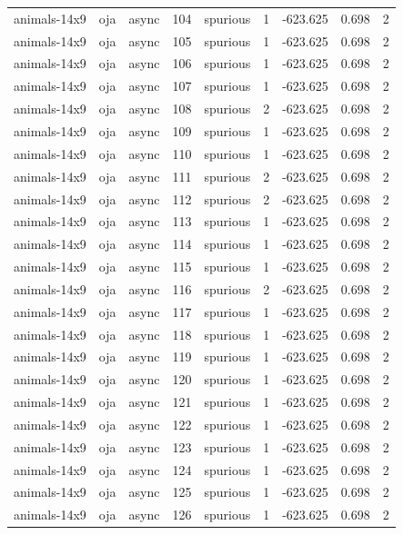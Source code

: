 \begin{tabular}{lllrlrrrr}
animals-14x9 & oja & async & 104 & spurious & 1 & -623.625 & 0.698 & 2 \\
animals-14x9 & oja & async & 105 & spurious & 1 & -623.625 & 0.698 & 2 \\
animals-14x9 & oja & async & 106 & spurious & 1 & -623.625 & 0.698 & 2 \\
animals-14x9 & oja & async & 107 & spurious & 1 & -623.625 & 0.698 & 2 \\
animals-14x9 & oja & async & 108 & spurious & 2 & -623.625 & 0.698 & 2 \\
animals-14x9 & oja & async & 109 & spurious & 1 & -623.625 & 0.698 & 2 \\
animals-14x9 & oja & async & 110 & spurious & 1 & -623.625 & 0.698 & 2 \\
animals-14x9 & oja & async & 111 & spurious & 2 & -623.625 & 0.698 & 2 \\
animals-14x9 & oja & async & 112 & spurious & 2 & -623.625 & 0.698 & 2 \\
animals-14x9 & oja & async & 113 & spurious & 1 & -623.625 & 0.698 & 2 \\
animals-14x9 & oja & async & 114 & spurious & 1 & -623.625 & 0.698 & 2 \\
animals-14x9 & oja & async & 115 & spurious & 1 & -623.625 & 0.698 & 2 \\
animals-14x9 & oja & async & 116 & spurious & 2 & -623.625 & 0.698 & 2 \\
animals-14x9 & oja & async & 117 & spurious & 1 & -623.625 & 0.698 & 2 \\
animals-14x9 & oja & async & 118 & spurious & 1 & -623.625 & 0.698 & 2 \\
animals-14x9 & oja & async & 119 & spurious & 1 & -623.625 & 0.698 & 2 \\
animals-14x9 & oja & async & 120 & spurious & 1 & -623.625 & 0.698 & 2 \\
animals-14x9 & oja & async & 121 & spurious & 1 & -623.625 & 0.698 & 2 \\
animals-14x9 & oja & async & 122 & spurious & 1 & -623.625 & 0.698 & 2 \\
animals-14x9 & oja & async & 123 & spurious & 1 & -623.625 & 0.698 & 2 \\
animals-14x9 & oja & async & 124 & spurious & 1 & -623.625 & 0.698 & 2 \\
animals-14x9 & oja & async & 125 & spurious & 1 & -623.625 & 0.698 & 2 \\
animals-14x9 & oja & async & 126 & spurious & 1 & -623.625 & 0.698 & 2 \\

\end{tabular}
